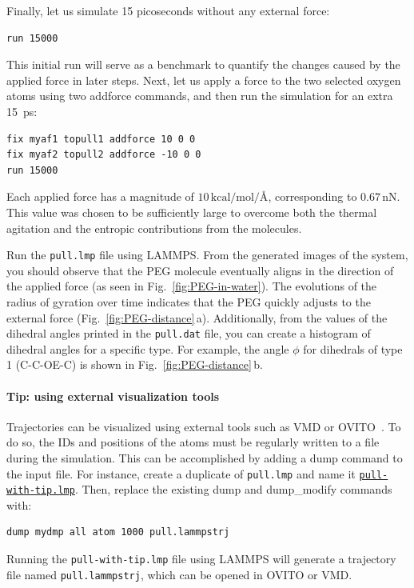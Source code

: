 \documentclass[9pt,tutorial]{livecoms}
\newcommand{\lmpcmd}[1]{\hspace{0pt}\colorbox{listing}{\textcolor{command}{\small{#1}}}\hspace{0pt}} %
\newcommand{\flecmd}[1]{\textcolor{command}{\texttt{#1}}} %
\newcommand{\dwlcmd}[1]{\textcolor{download}{\texttt{#1}}} %
\newcommand{\filepath}{https://raw.githubusercontent.com/lammpstutorials/lammpstutorials-article/main/files/}
\begin{document}
Finally, let us simulate 15 picoseconds without any external force:
\begin{lstlisting}
run 15000
\end{lstlisting}
This initial run will serve as a benchmark to quantify the changes caused by
the applied force in later steps.  Next, let us apply a force to the two selected
oxygen atoms using two \lmpcmd{addforce} commands, and then run the simulation
for an extra 15~ps:
\begin{lstlisting}
fix myaf1 topull1 addforce 10 0 0
fix myaf2 topull2 addforce -10 0 0
run 15000
\end{lstlisting}
Each applied force has a magnitude of $10\,\text{kcal/mol/\AA{}}$, corresponding to $0.67\,\text{nN}$.
This value was chosen to be sufficiently large to overcome both the thermal agitation and
the entropic contributions from the molecules.

Run the \flecmd{pull.lmp} file using LAMMPS.  From the generated images of the system,
you should observe that the PEG molecule eventually aligns
in the direction of the applied force (as seen in Fig.~\ref{fig:PEG-in-water}).
The evolutions of the radius of gyration over
time indicates that the PEG quickly adjusts to the external force
(Fig.~\ref{fig:PEG-distance}\,a).  Additionally, from the values of the dihedral angles
printed in the \flecmd{pull.dat} file, you can create a histogram
of dihedral angles for a specific type.  For example, the angle $\phi$ for dihedrals
of type 1 (C-C-OE-C) is shown in Fig.~\ref{fig:PEG-distance}\,b.

\paragraph{Tip: using external visualization tools}
\label{tip-external-viz}

Trajectories can be visualized using external tools such as VMD or
OVITO~\cite{humphrey1996vmd, stukowski2009visualization}.  To do so, the IDs and
positions of the atoms must be regularly written to a file during the
simulation.  This can be accomplished by adding a \lmpcmd{dump} command
to the input file.  For instance, create a duplicate of
\flecmd{pull.lmp} and name it
\href{\filepath tutorial3/solution/pull-with-tip.lmp}{\dwlcmd{pull-with-tip.lmp}}.
Then, replace the existing \lmpcmd{dump} and \lmpcmd{dump\_modify} commands with:
\begin{lstlisting}
dump mydmp all atom 1000 pull.lammpstrj
\end{lstlisting}
Running the \flecmd{pull-with-tip.lmp} file using LAMMPS will generate a trajectory file
named \flecmd{pull.lammpstrj}, which can be opened in OVITO or VMD.
\end{document}
